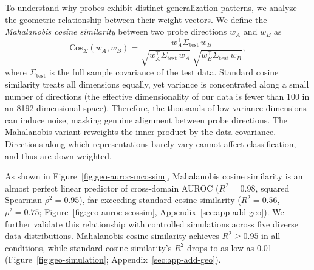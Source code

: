 \documentclass{article}
\theoremstyle{plain}
\theoremstyle{definition}
\theoremstyle{remark}
\begin{document}
To understand why probes exhibit distinct generalization patterns, we analyze the geometric relationship between their weight vectors.
We define the \emph{Mahalanobis cosine similarity} between two probe directions $w_A$ and $w_B$ as
\begin{equation}
\mathrm{Cos}_\Sigma(w_A, w_B) = \frac{w_A^\top \Sigma_{\mathrm{test}}\, w_B}
{\sqrt{w_A^\top \Sigma_{\mathrm{test}}\, w_A}\;\sqrt{w_B^\top \Sigma_{\mathrm{test}}\, w_B}},
\end{equation}
where $\Sigma_{\mathrm{test}}$ is the full sample covariance of the test data. Standard cosine similarity treats all dimensions equally, yet variance is concentrated along a small number of directions (the effective dimensionality of our data is fewer than 100 in an 8192-dimensional space). Therefore, the thousands of low-variance dimensions can induce noise, masking genuine alignment between probe directions. The Mahalanobis variant reweights the inner product by the data covariance. Directions along which representations barely vary cannot affect classification, and thus are down-weighted.

As shown in Figure~\ref{fig:geo-auroc-mcossim}, Mahalanobis cosine similarity is an almost perfect linear predictor of cross-domain AUROC ($R^2{=}0.98$, squared Spearman $\rho^2{=}0.95$), far exceeding standard cosine similarity ($R^2{=}0.56$, $\rho^2{=}0.75$; Figure~\ref{fig:geo-auroc-scossim}, Appendix~\ref{sec:app-add-geo}). We further validate this relationship with controlled simulations across five diverse data distributions. Mahalanobis cosine similarity achieves $R^2 \geq 0.95$ in all conditions, while standard cosine similarity's $R^2$ drops to as low as 0.01
(Figure~\ref{fig:geo-simulation}; Appendix~\ref{sec:app-add-geo}).

\end{document}

